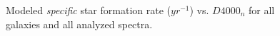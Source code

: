 \documentclass[modern]{aastex62}
\begin{document}
\begin{figure}
\caption{Modeled \emph{specific} star formation rate ($yr^{-1}$) vs. $D4000_n$ for all galaxies and all analyzed spectra.}
\label{fig:ssfrd4000}
\end{figure}
\end{document}
